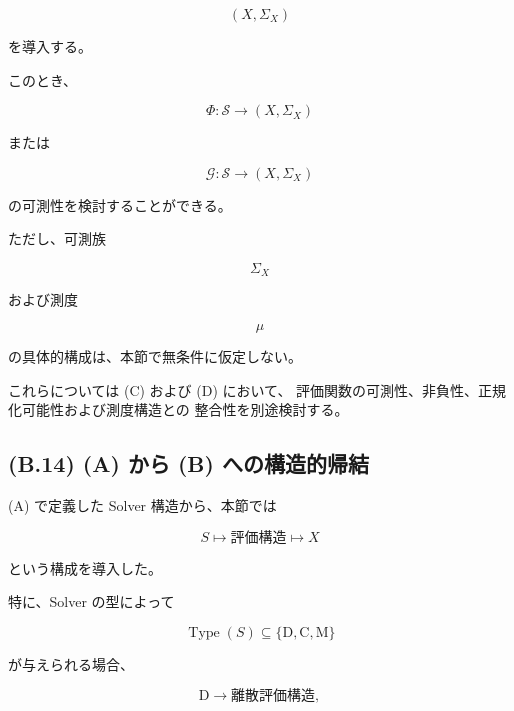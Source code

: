 \documentclass[a4paper,11pt]{article}
\newcommand{\Solver}{\mathcal{S}}
\newcommand{\Type}{\operatorname{Type}}
\newcommand{\DType}{\mathrm{D}}
\newcommand{\CType}{\mathrm{C}}
\newcommand{\MType}{\mathrm{M}}
\begin{document}
\begin{equation}
    (X,\Sigma_X)
\end{equation}

を導入する。

このとき、

\begin{equation}
    \Phi:
    \Solver
    \longrightarrow
    (X,\Sigma_X)
\end{equation}

または

\begin{equation}
    \mathcal{G}:
    \Solver
    \longrightarrow
    (X,\Sigma_X)
\end{equation}

の可測性を検討することができる。

ただし、可測族

\begin{equation}
    \Sigma_X
\end{equation}

および測度

\begin{equation}
    \mu
\end{equation}

の具体的構成は、本節で無条件に仮定しない。

これらについては (C) および (D) において、
評価関数の可測性、非負性、正規化可能性および測度構造との
整合性を別途検討する。


\subsection{(B.14) (A) から (B) への構造的帰結}
\label{subsec:B14}

(A) で定義した Solver 構造から、本節では

\begin{equation}
    \boxed{
        S
        \longmapsto
        \text{評価構造}
        \longmapsto
        X
    }
\end{equation}

という構成を導入した。

特に、Solver の型によって

\begin{equation}
    \Type(S)
    \subseteq
    \{\DType,\CType,\MType\}
\end{equation}

が与えられる場合、

\begin{equation}
    \DType
    \longrightarrow
    \text{離散評価構造},
\end{equation}
\end{document}
